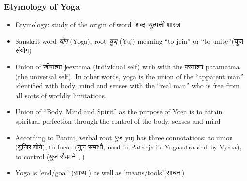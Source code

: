 \begin{frame}[fragile]\frametitle{Etymology of Yoga}

      \begin{itemize}
		\item Etymology: study of the origin of word. शब्द व्युत्पत्ती शास्त्र 
		\item Sanskrit word \textit{योग} (Yoga), root \textit{युज्} (Yuj) meaning “to join” or “to unite”.(युज संयोग)
		\item Union of  जीवात्मा  jeevatma  (individual  self) with with the परमात्मा paramatma (the universal self). In other words, yoga is the union of the “apparent man” identified with  body, mind and senses with the “real man” who is 
free from all sorts of worldly limitations.
\item Union of ``Body, Mind and Spirit'' as the purpose of Yoga is to attain spiritual perfection through the control 
of the body, senses and mind
		\item According to Panini, verbal root युज  yuj has three 
connotations: to union (युजिर योगे), to focus (युज समाधौ, used in Patanjali's Yogasutra and by Vyasa), to control (युज सैयमने , )
		\item Yoga is 'end/goal' (साध्य ) as well as 'means/tools'(साधना)
	  \end{itemize}

\end{frame}

